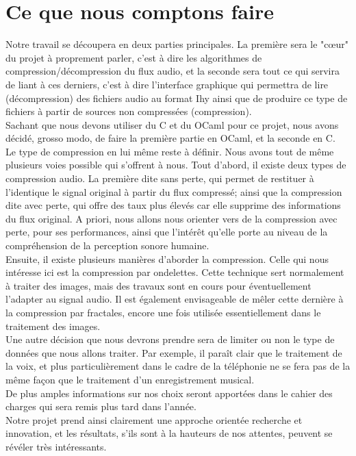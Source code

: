 \documentclass[a4paper,12pt]{article}
\begin{document}
\section*{Ce que nous comptons faire}
Notre travail se découpera en deux parties principales.   La  première	sera  le
"cœur"	du	projet	à  proprement  parler,	c'est  à  dire	les  algorithmes  de
compression/décompression du flux audio, et la seconde sera tout ce qui  servira
de liant à ces derniers, c'est à dire l'interface  graphique  qui  permettra  de
lire (décompression) des fichiers audio au format Ihy ainsi que de	produire  ce
type de fichiers à partir de sources non  compressées  (compression).\\  Sachant
que nous devons utiliser du C et du OCaml pour ce  projet,	nous  avons  décidé,
grosso modo, de faire la première partie en OCaml, et la seconde en C.\\ Le type
de compression en lui même reste à définir.  Nous avons tout de  même  plusieurs
voies possible qui s'offrent à nous.  Tout d'abord,  il  existe  deux  types  de
compression audio.	La première dite sans  perte,  qui	permet	de	restituer  à
l'identique le signal  original  à	partir	du	flux  compressé;  ainsi  que  la
compression dite avec perte, qui offre des taux plus élevés  car  elle	supprime
des informations du flux original.	A priori, nous allons nous orienter vers  de
la compression avec perte, pour ses performances, ainsi  que  l'intérêt  qu'elle
porte au niveau de la compréhension de la perception sonore humaine.\\	Ensuite,
il existe plusieurs manières d'aborder la compression. Celle qui nous intéresse
ici est la compression par	ondelettes.   Cette  technique	sert  normalement  à
traiter des images, mais des travaux sont en cours pour éventuellement l'adapter
au signal audio.  Il est également envisageable de mêler  cette  dernière  à  la
compression par fractales, encore une  fois  utilisée  essentiellement	dans  le
traitement des images.\\ Une autre décision que nous  devrons  prendre	sera  de
limiter ou non le type de données que nous	allons	traiter.   Par	exemple,  il
paraît clair que le traitement de la voix,	et	plus  particulièrement	dans  le
cadre de la téléphonie ne se fera pas de la même façon que	le	traitement	d'un
enregistrement musical.\\ De plus  amples  informations  sur  nos  choix  seront
apportées dans le cahier des charges qui sera remis plus  tard	dans  l'année.\\
Notre  projet  prend  ainsi  clairement  une  approche	orientée  recherche   et
innovation, et les résultats, s'ils sont à la hauteurs de nos attentes,  peuvent
se révéler très intéressants.
\end{document}
